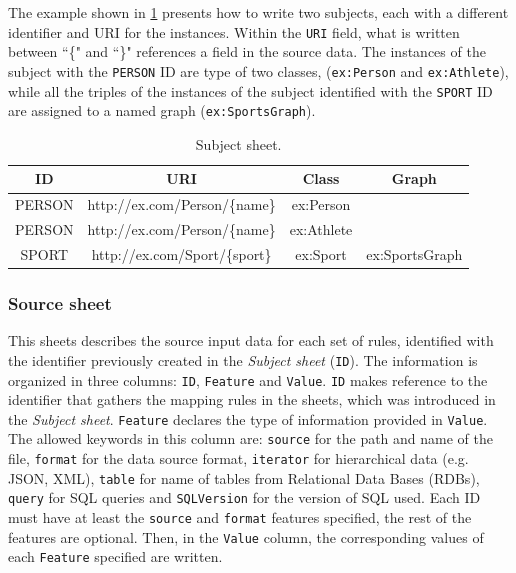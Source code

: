 The example shown in \cref{tab:subject_sheet} presents how to write two subjects, each with a different identifier and URI for the instances. Within the \texttt{URI} field, what is written between ``\{" and ``\}" references a field in the source data. The instances of the subject with the \texttt{PERSON} ID are type of two classes, (\texttt{ex:Person} and \texttt{ex:Athlete}), while all the triples of the instances of the subject identified with the \texttt{SPORT} ID are assigned to a named graph (\texttt{ex:SportsGraph}). 


\begin{table}[h!]
\caption{Subject sheet.}
\label{tab:subject_sheet}
\centering
\begin{tabular}{c|c|c|c}
\midrule
\textbf{ID} & \textbf{URI} & \textbf{Class} & \textbf{Graph} \\ \midrule
PERSON & http://ex.com/Person/\{name\} & ex:Person &  \\
PERSON & http://ex.com/Person/\{name\} & ex:Athlete &  \\
SPORT & http://ex.com/Sport/\{sport\} & ex:Sport & ex:SportsGraph \\ \midrule
\end{tabular}
\end{table}



\subsubsection{Source sheet} 

This sheets describes the source input data for each set of rules, identified with the identifier previously created in the \textit{Subject sheet} (\texttt{ID}). The information is organized in three columns: \texttt{ID}, \texttt{Feature} and \texttt{Value}. 
\texttt{ID} makes reference to the identifier that gathers the mapping rules in the sheets, which was introduced in the \textit{Subject sheet}. 
\texttt{Feature} declares the type of information provided in \texttt{Value}. The allowed keywords in this column are: \texttt{source} for the path and name of the file, \texttt{format} for the data source format, \texttt{iterator} for hierarchical data (e.g. JSON, XML), \texttt{table} for name of tables from Relational Data Bases (RDBs), \texttt{query} for SQL queries and \texttt{SQLVersion} for the version of SQL used. Each ID must have at least the \texttt{source} and \texttt{format} features specified, the rest of the features are optional. 
Then, in the \texttt{Value} column, the corresponding values of each \texttt{Feature} specified are written. 

